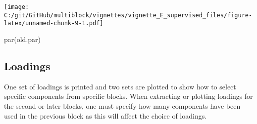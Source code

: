 \documentclass[
]{article}
\newenvironment{Shaded}{\begin{snugshade}}{\end{snugshade}}
\newcommand{\FunctionTok}[1]{\textcolor[rgb]{0.00,0.00,0.00}{#1}}
\newcommand{\NormalTok}[1]{#1}
\begin{document}
\texttt{[image: C:/git/GitHub/multiblock/vignettes/vignette\_E\_supervised\_files/figure-latex/unnamed-chunk-9-1.pdf]}

\begin{Shaded}
\begin{Highlighting}[]
\FunctionTok{par}\NormalTok{(old.par)}
\end{Highlighting}
\end{Shaded}

\hypertarget{loadings}{%
\subsection{Loadings}\label{loadings}}

One set of loadings is printed and two sets are plotted to show how to
select specific components from specific blocks. When extracting or
plotting loadings for the second or later blocks, one must specify how
many components have been used in the previous block as this will affect
the choice of loadings.
\end{document}
